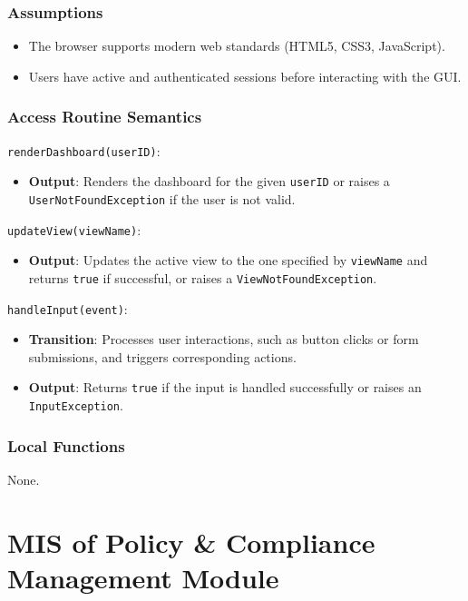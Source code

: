 \documentclass[12pt, titlepage]{article}
\begin{document}
\subsubsection{Assumptions}
\begin{itemize}
    \item The browser supports modern web standards (HTML5, CSS3, JavaScript).
    \item Users have active and authenticated sessions before interacting with the GUI.
\end{itemize}

\subsubsection{Access Routine Semantics}

\noindent \texttt{renderDashboard(userID)}:
\begin{itemize}
    \item \textbf{Output}: Renders the dashboard for the given \texttt{userID} or raises a \texttt{UserNotFoundException} if the user is not valid.
\end{itemize}

\noindent \texttt{updateView(viewName)}:
\begin{itemize}
    \item \textbf{Output}: Updates the active view to the one specified by \texttt{viewName} and returns \texttt{true} if successful, or raises a \texttt{ViewNotFoundException}.
\end{itemize}

\noindent \texttt{handleInput(event)}:
\begin{itemize}
    \item \textbf{Transition}: Processes user interactions, such as button clicks or form submissions, and triggers corresponding actions.
    \item \textbf{Output}: Returns \texttt{true} if the input is handled successfully or raises an \texttt{InputException}.
\end{itemize}

\subsubsection{Local Functions}
None.

\section{MIS of Policy \& Compliance Management Module}
\end{document}

